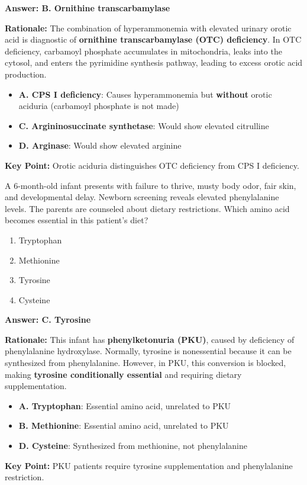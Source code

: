 \begin{solution}
\textbf{Answer: B. Ornithine transcarbamylase}

\textbf{Rationale:} The combination of hyperammonemia with elevated urinary orotic acid is diagnostic of \textbf{ornithine transcarbamylase (OTC) deficiency}. In OTC deficiency, carbamoyl phosphate accumulates in mitochondria, leaks into the cytosol, and enters the pyrimidine synthesis pathway, leading to excess orotic acid production.

\begin{itemize}
    \item \textbf{A. CPS I deficiency}: Causes hyperammonemia but \textbf{without} orotic aciduria (carbamoyl phosphate is not made)
    \item \textbf{C. Argininosuccinate synthetase}: Would show elevated citrulline
    \item \textbf{D. Arginase}: Would show elevated arginine
\end{itemize}

\textbf{Key Point:} Orotic aciduria distinguishes OTC deficiency from CPS I deficiency.
\end{solution}

\begin{exercise}
A 6-month-old infant presents with failure to thrive, musty body odor, fair skin, and developmental delay. Newborn screening reveals elevated phenylalanine levels. The parents are counseled about dietary restrictions. Which amino acid becomes essential in this patient's diet?
\begin{enumerate}[label=\Alph*.]
    \item Tryptophan
    \item Methionine
    \item Tyrosine
    \item Cysteine
\end{enumerate}
\end{exercise}

\begin{solution}
\textbf{Answer: C. Tyrosine}

\textbf{Rationale:} This infant has \textbf{phenylketonuria (PKU)}, caused by deficiency of phenylalanine hydroxylase. Normally, tyrosine is nonessential because it can be synthesized from phenylalanine. However, in PKU, this conversion is blocked, making \textbf{tyrosine conditionally essential} and requiring dietary supplementation.

\begin{itemize}
    \item \textbf{A. Tryptophan}: Essential amino acid, unrelated to PKU
    \item \textbf{B. Methionine}: Essential amino acid, unrelated to PKU
    \item \textbf{D. Cysteine}: Synthesized from methionine, not phenylalanine
\end{itemize}

\textbf{Key Point:} PKU patients require tyrosine supplementation and phenylalanine restriction.
\end{solution}

